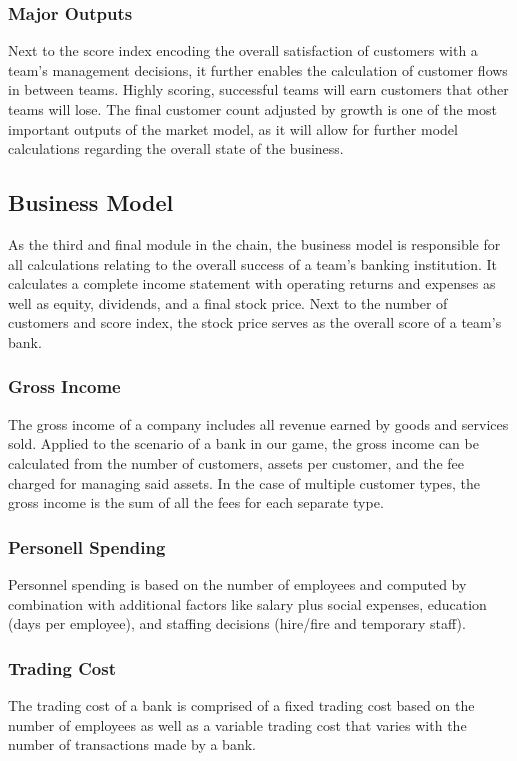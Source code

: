 \subsubsection{Major Outputs}
Next to the score index encoding the overall satisfaction of customers with a team's management decisions, it further enables the calculation of customer flows in between teams. Highly scoring, successful teams will earn customers that other teams will lose. The final customer count adjusted by growth is one of the most important outputs of the market model, as it will allow for further model calculations regarding the overall state of the business.


\subsection{Business Model}
As the third and final module in the chain, the business model is responsible for all calculations relating to the overall success of a team's banking institution. It calculates a complete income statement with operating returns and expenses as well as equity, dividends, and a final stock price. Next to the number of customers and score index, the stock price serves as the overall score of a team's bank.

\subsubsection{Gross Income}
The gross income of a company includes all revenue earned by goods and services sold. Applied to the scenario of a bank in our game, the gross income can be calculated from the number of customers, assets per customer, and the fee charged for managing said assets. In the case of multiple customer types, the gross income is the sum of all the fees for each separate type.

\subsubsection{Personell Spending}
Personnel spending is based on the number of employees and computed by combination with additional factors like salary plus social expenses, education (days per employee), and staffing decisions (hire/fire and temporary staff).

\subsubsection{Trading Cost}
The trading cost of a bank is comprised of a fixed trading cost based on the number of employees as well as a variable trading cost that varies with the number of transactions made by a bank.

